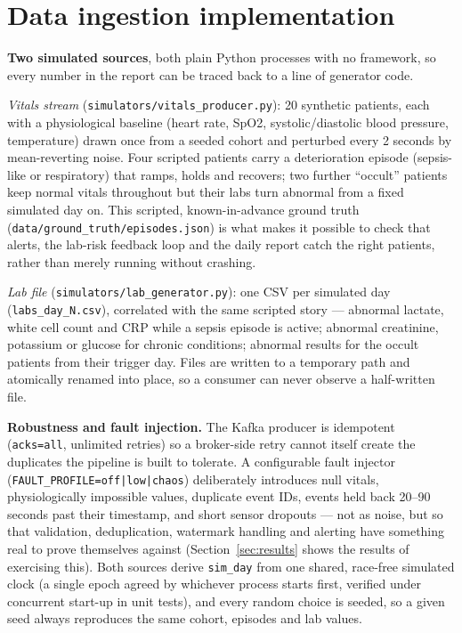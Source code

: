 \documentclass[11pt,a4paper]{article}
\newcommand{\code}[1]{\texttt{\small #1}}
\begin{document}
\section{Data ingestion implementation}

\textbf{Two simulated sources}, both plain Python processes with no framework, so every number in
the report can be traced back to a line of generator code.

\emph{Vitals stream} (\code{simulators/vitals\_producer.py}): 20 synthetic patients, each with a
physiological baseline (heart rate, SpO2, systolic/diastolic blood pressure, temperature) drawn once
from a seeded cohort and perturbed every 2 seconds by mean-reverting noise. Four scripted patients
carry a deterioration episode (sepsis-like or respiratory) that ramps, holds and recovers; two
further ``occult'' patients keep normal vitals throughout but their labs turn abnormal from a fixed
simulated day on. This scripted, known-in-advance ground truth (\code{data/ground\_truth/episodes.json})
is what makes it possible to check that alerts, the lab-risk feedback loop and the daily report catch
the right patients, rather than merely running without crashing.

\emph{Lab file} (\code{simulators/lab\_generator.py}): one CSV per simulated day
(\code{labs\_day\_N.csv}), correlated with the same scripted story --- abnormal lactate, white cell
count and CRP while a sepsis episode is active; abnormal creatinine, potassium or glucose for chronic
conditions; abnormal results for the occult patients from their trigger day. Files are written to a
temporary path and atomically renamed into place, so a consumer can never observe a half-written
file.

\textbf{Robustness and fault injection.} The Kafka producer is idempotent (\code{acks=all}, unlimited
retries) so a broker-side retry cannot itself create the duplicates the pipeline is built to
tolerate. A configurable fault injector (\code{FAULT\_PROFILE=off|low|chaos}) deliberately introduces
null vitals, physiologically impossible values, duplicate event IDs, events held back 20--90 seconds
past their timestamp, and short sensor dropouts --- not as noise, but so that validation,
deduplication, watermark handling and alerting have something real to prove themselves against
(Section~\ref{sec:results} shows the results of exercising this). Both sources derive \code{sim\_day}
from one shared, race-free simulated clock (a single epoch agreed by whichever process starts first,
verified under concurrent start-up in unit tests), and every random choice is seeded, so a given seed
always reproduces the same cohort, episodes and lab values.
\end{document}
